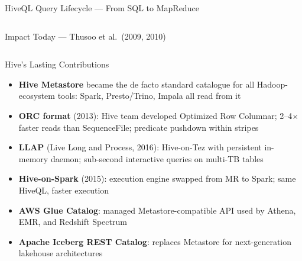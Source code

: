 \documentclass[aspectratio=169,10pt]{beamer}
\begin{document}
\begin{frame}{HiveQL Query Lifecycle — From SQL to MapReduce}
\begin{columns}[T]
\begin{center}
      \end{center}
  \end{columns}
\end{frame}

\begin{frame}{Impact Today — Thusoo et al.\ (2009, 2010)}
  \begin{columns}[T]
      \begin{block}{Hive's Lasting Contributions}
        \begin{itemize}
          \item \textbf{Hive Metastore} became the de facto standard
                catalogue for all Hadoop-ecosystem tools:
                Spark, Presto/Trino, Impala all read from it
          \item \textbf{ORC format} (2013): Hive team developed
                Optimized Row Columnar; 2--4$\times$ faster reads than
                SequenceFile; predicate pushdown within stripes
          \item \textbf{LLAP} (Live Long and Process, 2016):
                Hive-on-Tez with persistent in-memory daemon;
                sub-second interactive queries on multi-TB tables
          \item \textbf{Hive-on-Spark} (2015): execution engine
                swapped from MR to Spark; same HiveQL, faster execution
          \item \textbf{AWS Glue Catalog}: managed Metastore-compatible
                API used by Athena, EMR, and Redshift Spectrum
          \item \textbf{Apache Iceberg REST Catalog}: replaces Metastore
                for next-generation lakehouse architectures
        \end{itemize}
      \end{block}


\end{columns}
\end{frame}
\end{document}
